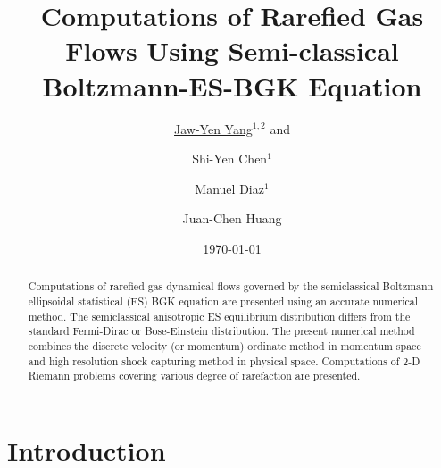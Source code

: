 \documentclass[twoside,twocolumn,prc,floats,amsmath,amssymb]{revtex4} %
\begin{document}
\title{Computations of Rarefied Gas Flows Using Semi-classical Boltzmann-ES-BGK Equation}
\author{\underline{Jaw-Yen Yang$^{1,2}$} and} %
\author{ Shi-Yen Chen$^{1}$} %
\author{ Manuel Diaz$^{1}$}
\author{Juan-Chen Huang}
\date{\today}

\begin{abstract}
Computations of rarefied gas dynamical flows governed by the semiclassical Boltzmann ellipsoidal statistical (ES) BGK equation are presented using an accurate numerical method.  The semiclassical anisotropic ES equilibrium distribution differs from the standard Fermi-Dirac or Bose-Einstein distribution.  The present numerical method combines the discrete velocity (or momentum) ordinate method in momentum space and high resolution shock capturing method in physical space.  Computations of 2-D Riemann problems covering various degree of rarefaction are presented.  
\end{abstract}

\address{$^{1}$Institute of Applied Mechanics, National Taiwan
University, Taipei 106, TAIWAN}
\address{$^{2}$Center of Advanced Study in Theoretical Science, National Taiwan
University, Taipei 106, TAIWAN}
\address{$^{1}$Department of Merchant Marine, National Taiwan Ocean University, Keelung, TAIWAN}

\maketitle

\section{Introduction}

\label{sec:1}   
\end{document}
